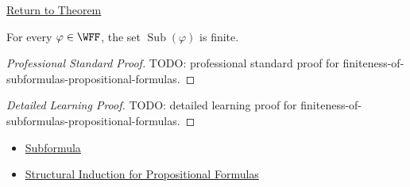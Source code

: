 \newpage
{}
\label{prf:finiteness-of-subformulas-propositional-formulas}

\begin{remark*}[Return]
\hyperref[lem:finiteness-of-subformulas-propositional-formulas]{Return to Theorem}
\end{remark*}

\begin{lemma*}
For every \(\varphi\in\WFF\), the set \(\operatorname{Sub}(\varphi)\) is finite.
\end{lemma*}

\begin{proof}[Professional Standard Proof]
\LRAProofBodyStart
TODO: professional standard proof for finiteness-of-subformulas-propositional-formulas.
\end{proof}

\begin{proof}[Detailed Learning Proof]
\LRAProofBodyStart
TODO: detailed learning proof for finiteness-of-subformulas-propositional-formulas.
\end{proof}

\begin{remark*}
\end{remark*}

\begin{dependencies}
\begin{itemize}
  \item \hyperref[def:subformula-propositional-logic]{Subformula}
  \item \hyperref[thm:structural-induction-propositional-formulas]{Structural Induction for Propositional Formulas}
\end{itemize}
\end{dependencies}

\clearpage
